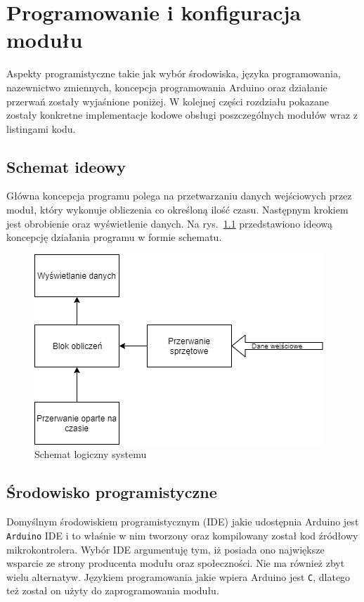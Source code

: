 \chapter{Programowanie i konfiguracja modułu}
Aspekty programistyczne takie jak wybór środowiska, języka programowania, nazewnictwo zmiennych, koncepcja programowania Arduino oraz działanie przerwań zostały wyjaśnione poniżej. W kolejnej części rozdziału pokazane zostały konkretne implementacje kodowe obsługi poszczególnych modułów wraz z listingami kodu.

\section{Schemat ideowy}
Główna koncepcja programu polega na przetwarzaniu danych wejściowych przez moduł, który wykonuje obliczenia co określoną ilość czasu. Następnym krokiem jest obrobienie oraz wyświetlenie danych. Na rys.~\ref{fig:schemat} przedstawiono ideową koncepcję działania programu w formie schematu.

\begin{figure}[!htb]
\centering
\includegraphics[width=0.7\linewidth]{Rysunki/schemat_logiczny.png}
\caption{Schemat logiczny systemu}
\label{fig:schemat}
\end{figure}

\section{Środowisko programistyczne}

Domyślnym środowiskiem programistycznym (IDE) jakie udostępnia Arduino jest \texttt{Arduino} IDE i to właśnie w nim tworzony oraz kompilowany został kod źródłowy mikrokontrolera. Wybór IDE argumentuję tym, iż posiada ono największe wsparcie ze strony producenta modułu oraz społeczności. Nie ma również zbyt wielu alternatyw. Językiem programowania jakie wpiera Arduino jest \texttt{C}, dlatego też został on użyty do zaprogramowania modułu.

